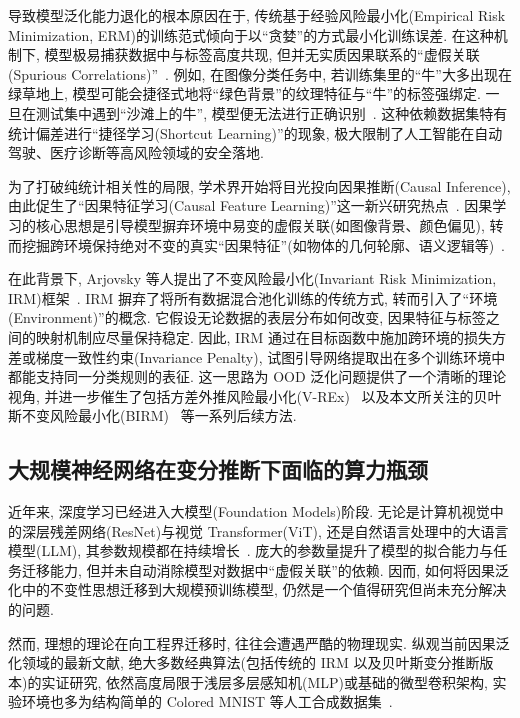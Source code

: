 \documentclass[a4paper,punct=banjiao,twoside]{ctexrep}
\theoremstyle{plain}
\theoremstyle{definition}
\theoremstyle{remark}
\begin{document}
导致模型泛化能力退化的根本原因在于, 传统基于经验风险最小化(Empirical Risk Minimization, ERM)的训练范式倾向于以“贪婪”的方式最小化训练误差. 在这种机制下, 模型极易捕获数据中与标签高度共现, 但并无实质因果联系的“虚假关联(Spurious Correlations)”~\cite{geirhos2020shortcut}. 例如, 在图像分类任务中, 若训练集里的“牛”大多出现在绿草地上, 模型可能会捷径式地将“绿色背景”的纹理特征与“牛”的标签强绑定. 一旦在测试集中遇到“沙滩上的牛”, 模型便无法进行正确识别~\cite{beery2018recognition}. 这种依赖数据集特有统计偏差进行“捷径学习(Shortcut Learning)”的现象, 极大限制了人工智能在自动驾驶、医疗诊断等高风险领域的安全落地.

为了打破纯统计相关性的局限, 学术界开始将目光投向因果推断(Causal Inference), 由此促生了“因果特征学习(Causal Feature Learning)”这一新兴研究热点~\cite{scholkopf2021toward}. 因果学习的核心思想是引导模型摒弃环境中易变的虚假关联(如图像背景、颜色偏见), 转而挖掘跨环境保持绝对不变的真实“因果特征”(如物体的几何轮廓、语义逻辑等)~\cite{peters2017elements}.

在此背景下, Arjovsky 等人提出了不变风险最小化(Invariant Risk Minimization, IRM)框架~\cite{arjovsky2019invariant}. IRM 摒弃了将所有数据混合池化训练的传统方式, 转而引入了“环境(Environment)”的概念. 它假设无论数据的表层分布如何改变, 因果特征与标签之间的映射机制应尽量保持稳定. 因此, IRM 通过在目标函数中施加跨环境的损失方差或梯度一致性约束(Invariance Penalty), 试图引导网络提取出在多个训练环境中都能支持同一分类规则的表征. 这一思路为 OOD 泛化问题提供了一个清晰的理论视角, 并进一步催生了包括方差外推风险最小化(V-REx)~\cite{krueger2021out} 以及本文所关注的贝叶斯不变风险最小化(BIRM)~\cite{lin2022bayesian} 等一系列后续方法.

\subsection{大规模神经网络在变分推断下面临的算力瓶颈}

近年来, 深度学习已经进入大模型(Foundation Models)阶段. 无论是计算机视觉中的深层残差网络(ResNet)与视觉 Transformer(ViT), 还是自然语言处理中的大语言模型(LLM), 其参数规模都在持续增长~\cite{kaplan2020scaling}. 庞大的参数量提升了模型的拟合能力与任务迁移能力, 但并未自动消除模型对数据中“虚假关联”的依赖. 因而, 如何将因果泛化中的不变性思想迁移到大规模预训练模型, 仍然是一个值得研究但尚未充分解决的问题.

然而, 理想的理论在向工程界迁移时, 往往会遭遇严酷的物理现实. 纵观当前因果泛化领域的最新文献, 绝大多数经典算法(包括传统的 IRM 以及贝叶斯变分推断版本)的实证研究, 依然高度局限于浅层多层感知机(MLP)或基础的微型卷积架构, 实验环境也多为结构简单的 Colored MNIST 等人工合成数据集~\cite{gulrajani2020search}. 
\end{document}
